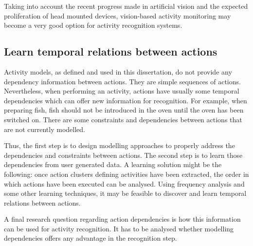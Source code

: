 Taking into account the recent progress made in artificial vision and the expected proliferation of head mounted devices, vision-based activity monitoring may become a very good option for activity recognition systems.

\subsection{Learn temporal relations between actions}

Activity models, as defined and used in this dissertation, do not provide any dependency information between actions. They are simple sequences of actions. Nevertheless, when performing an activity, actions have usually some temporal dependencies which can offer new information for recognition. For example, when preparing fish, fish should not be introduced in the oven until the oven has been switched on. There are some constraints and dependencies between actions that are not currently modelled.

Thus, the first step is to design modelling approaches to properly address the dependencies and constraints between actions. The second step is to learn those dependencies from user generated data. A learning solution might be the following: once action clusters defining activities have been extracted, the order in which actions have been executed can be analysed. Using frequency analysis and some other learning techniques, it may be feasible to discover and learn temporal relations between actions. 

A final research question regarding action dependencies is how this information can be used for activity recognition. It has to be analysed whether modelling dependencies offers any advantage in the recognition step.
